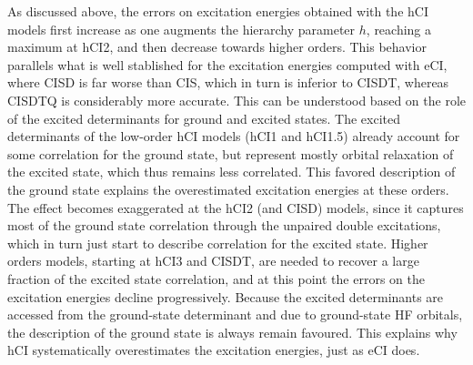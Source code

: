 \documentclass[aip,jcp,reprint,noshowkeys,superscriptaddress]{revtex4-1}
\begin{document}
As discussed above, the errors on excitation energies obtained with the hCI models first increase as one augments the hierarchy parameter $h$, reaching a maximum at hCI2, and then decrease towards higher orders.
This behavior parallels what is well stablished for the excitation energies computed with eCI, where CISD is far worse than CIS, which in turn is inferior to CISDT, whereas CISDTQ is considerably more accurate.
This can be understood based on the role of the excited determinants for ground and excited states.
The excited determinants of the low-order hCI models (hCI1 and hCI1.5) already account for some correlation for the ground state,
but represent mostly orbital relaxation of the excited state, which thus remains less correlated.
This favored description of the ground state explains the overestimated excitation energies at these orders.
The effect becomes exaggerated at the hCI2 (and CISD) models, since it captures most of the ground state correlation through the unpaired double excitations,
which in turn just start to describe correlation for the excited state.
Higher orders models, starting at hCI3 and CISDT, are needed to recover a large fraction of the excited state correlation, and at this point the errors on the excitation energies decline progressively.
Because the excited determinants are accessed from the ground-state determinant and due to ground-state HF orbitals, the description of the ground state is always remain favoured.
This explains why hCI systematically overestimates the excitation energies, just as eCI does.
\end{document}
